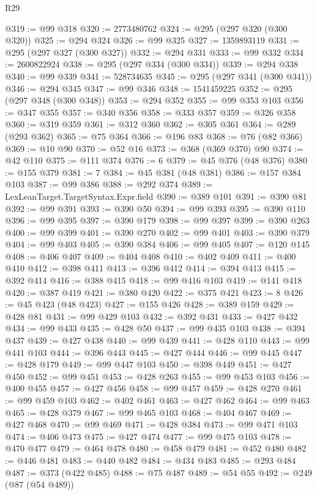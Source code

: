 \begin{lexlean}{R29}
\begin{coremodule}
@319 := @99 @318
@320 := 2773480762
@324 := @295 (@297 @320 (@300 @320))
@325 := @294 @324
@326 := @99 @325
@327 := 1359893119
@331 := @295 (@297 @327 (@300 @327))
@332 := @294 @331
@333 := @99 @332
@334 := 2600822924
@338 := @295 (@297 @334 (@300 @334))
@339 := @294 @338
@340 := @99 @339
@341 := 528734635
@345 := @295 (@297 @341 (@300 @341))
@346 := @294 @345
@347 := @99 @346
@348 := 1541459225
@352 := @295 (@297 @348 (@300 @348))
@353 := @294 @352
@355 := @99 @353 @103
@356 := @347 @355
@357 := @340 @356
@358 := @333 @357
@359 := @326 @358
@360 := @319 @359
@361 := @312 @360
@362 := @305 @361
@364 := @289 (@293 @362)
@365 := @75 @364
@366 := @196 @83
@368 := @76 (@82 @366)
@369 := @10 @90
@370 := @52 @16
@373 := @368 (@369 @370) @90
@374 := @42 @110
@375 := @111 @374
@376 := 6
@379 := @45 @376 (@48 @376)
@380 := @155 @379
@381 := 7
@384 := @45 @381 (@48 @381)
@386 := @157 @384 @103
@387 := @99 @386
@388 := @292 @374
@389 := LexLeanTarget.TargetSyntax.Expr.field
@390 := @389 @101
@391 := @390 @81
@392 := @99 @391
@393 := @390 @50
@394 := @99 @393
@395 := @390 @110
@396 := @99 @395
@397 := @390 @179
@398 := @99 @397
@399 := @390 @263
@400 := @99 @399
@401 := @390 @270
@402 := @99 @401
@403 := @390 @379
@404 := @99 @403
@405 := @390 @384
@406 := @99 @405
@407 := @120 @145
@408 := @406 @407
@409 := @404 @408
@410 := @402 @409
@411 := @400 @410
@412 := @398 @411
@413 := @396 @412
@414 := @394 @413
@415 := @392 @414
@416 := @388 @415
@418 := @99 @416 @103
@419 := @141 @418
@420 := @387 @419
@421 := @380 @420
@422 := @375 @421
@423 := 8
@426 := @45 @423 (@48 @423)
@427 := @155 @426
@428 := @389 @159
@429 := @428 @81
@431 := @99 @429 @103
@432 := @392 @431
@433 := @427 @432
@434 := @99 @433
@435 := @428 @50
@437 := @99 @435 @103
@438 := @394 @437
@439 := @427 @438
@440 := @99 @439
@441 := @428 @110
@443 := @99 @441 @103
@444 := @396 @443
@445 := @427 @444
@446 := @99 @445
@447 := @428 @179
@449 := @99 @447 @103
@450 := @398 @449
@451 := @427 @450
@452 := @99 @451
@453 := @428 @263
@455 := @99 @453 @103
@456 := @400 @455
@457 := @427 @456
@458 := @99 @457
@459 := @428 @270
@461 := @99 @459 @103
@462 := @402 @461
@463 := @427 @462
@464 := @99 @463
@465 := @428 @379
@467 := @99 @465 @103
@468 := @404 @467
@469 := @427 @468
@470 := @99 @469
@471 := @428 @384
@473 := @99 @471 @103
@474 := @406 @473
@475 := @427 @474
@477 := @99 @475 @103
@478 := @470 @477
@479 := @464 @478
@480 := @458 @479
@481 := @452 @480
@482 := @446 @481
@483 := @440 @482
@484 := @434 @483
@485 := @293 @484
@487 := @373 (@422 @485)
@488 := @75 @487
@489 := @54 @55
@492 := @249 (@87 (@54 @489))

\end{coremodule}
\end{lexlean}
